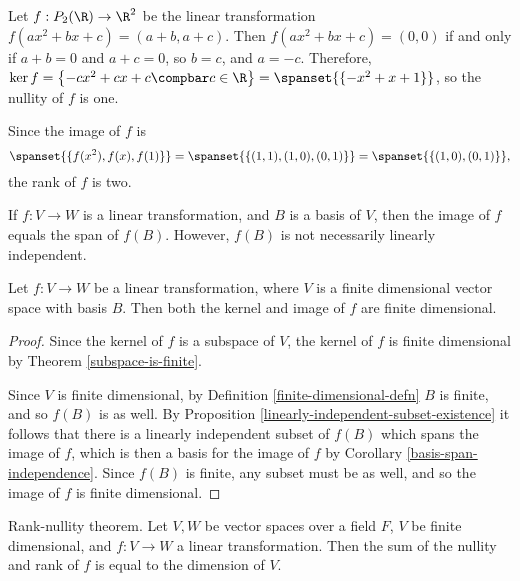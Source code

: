 \documentclass[12pt]{article}
\begin{document}
\begin{exmp}
    Let $f: P_2(\R) \to \R^2$ be the linear transformation $f(ax^2 + bx + c) = (a + b, a + c)$. Then $f(ax^2 + bx + c) = (0, 0)$ if and only if $a + b = 0$ and $a + c = 0$, so $b = c$, and $a = -c$. Therefore, $\ker f = \left\{-cx^2 + cx + c \compbar c \in \R \right\} = \spanset{\{-x^2 + x + 1\}}$, so the nullity of $f$ is one.

    Since the image of $f$ is \[\spanset{\{f(x^2), f(x), f(1)\}} = \spanset{\{(1, 1), (1, 0), (0, 1)\}} = \spanset{\{(1, 0), (0, 1)\}},\] the rank of $f$ is two.
\end{exmp}

\begin{rmk}
    If $f: V \to W$ is a linear transformation, and $B$ is a basis of $V$, then the image of $f$ equals the span of $f(B)$. However, $f(B)$ is not necessarily linearly independent.
\end{rmk}

\begin{prop}\label{kernel-image-are-finite}
    Let $f: V \to W$ be a linear transformation, where $V$ is a finite dimensional vector space with basis $B$. Then both the kernel and image of $f$ are finite dimensional.
\end{prop}

\begin{proof}
    Since the kernel of $f$ is a subspace of $V$, the kernel of $f$ is finite dimensional by Theorem \ref{subspace-is-finite}.

    Since $V$ is finite dimensional, by Definition \ref{finite-dimensional-defn} $B$ is finite, and so $f(B)$ is as well. By Proposition \ref{linearly-independent-subset-existence} it follows that there is a linearly independent subset of $f(B)$ which spans the image of $f$, which is then a basis for the image of $f$ by Corollary \ref{basis-span-independence}. Since $f(B)$ is finite, any subset must be as well, and so the image of $f$ is finite dimensional.
\end{proof}

\begin{thm}\label{rank-nullity}
    Rank-nullity theorem. Let $V, W$ be vector spaces over a field $F$, $V$ be finite dimensional, and $f: V \to W$ a linear transformation. Then the sum of the nullity and rank of $f$ is equal to the dimension of $V$.
\end{thm}
\end{document}
